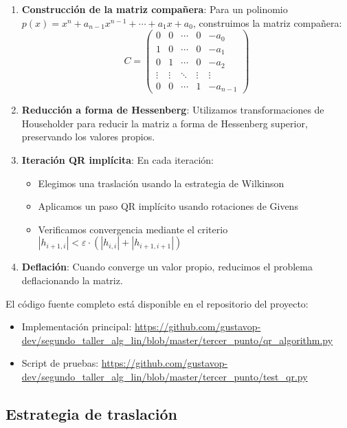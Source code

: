 \documentclass[12pt]{article}
\begin{document}
\begin{enumerate}
    \item \textbf{Construcción de la matriz compañera}: Para un polinomio 
    $p(x) = x^n + a_{n-1}x^{n-1} + \cdots + a_1x + a_0$, construimos la matriz compañera:
    \[
    C = \begin{pmatrix}
    0 & 0 & \cdots & 0 & -a_0 \\
    1 & 0 & \cdots & 0 & -a_1 \\
    0 & 1 & \cdots & 0 & -a_2 \\
    \vdots & \vdots & \ddots & \vdots & \vdots \\
    0 & 0 & \cdots & 1 & -a_{n-1}
    \end{pmatrix}
    \]
    
    \item \textbf{Reducción a forma de Hessenberg}: Utilizamos transformaciones de Householder para reducir la matriz a forma de Hessenberg superior, preservando los valores propios.
    
    \item \textbf{Iteración QR implícita}: En cada iteración:
    \begin{itemize}
        \item Elegimos una traslación usando la estrategia de Wilkinson
        \item Aplicamos un paso QR implícito usando rotaciones de Givens
        \item Verificamos convergencia mediante el criterio $|h_{i+1,i}| < \varepsilon \cdot (|h_{i,i}| + |h_{i+1,i+1}|)$
    \end{itemize}
    
    \item \textbf{Deflación}: Cuando converge un valor propio, reducimos el problema deflacionando la matriz.
\end{enumerate}

El código fuente completo está disponible en el repositorio del proyecto:
\begin{itemize}
    \item Implementación principal: \url{https://github.com/gustavop-dev/segundo_taller_alg_lin/blob/master/tercer_punto/qr_algorithm.py}
    \item Script de pruebas: \url{https://github.com/gustavop-dev/segundo_taller_alg_lin/blob/master/tercer_punto/test_qr.py}
\end{itemize}

\subsection{Estrategia de traslación}
\end{document}
